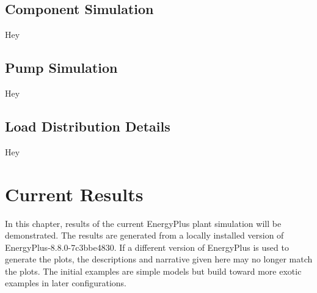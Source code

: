 \documentclass{report}
\begin{document}
    \section{Component Simulation}\label{sec:modeling-component}

      Hey

    \section{Pump Simulation}\label{sec:modeling-pumps}

      Hey

    \section{Load Distribution Details}\label{sec:modeling-dispatch}

      Hey

  \chapter{Current Results}\label{ch:current}

    In this chapter, results of the current EnergyPlus plant simulation will be demonstrated.
    The results are generated from a locally installed version of EnergyPlus-8.8.0-7c3bbe4830.
    If a different version of EnergyPlus is used to generate the plots, the descriptions and narrative given here may no longer match the plots.
    The initial examples are simple models but build toward more exotic examples in later configurations.
\end{document}

